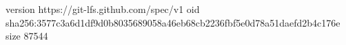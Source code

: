 version https://git-lfs.github.com/spec/v1
oid sha256:3577c3a6d1df9d0b8035689058a46eb68cb2236fbf5e0d78a51daefd2b4c176e
size 87544
